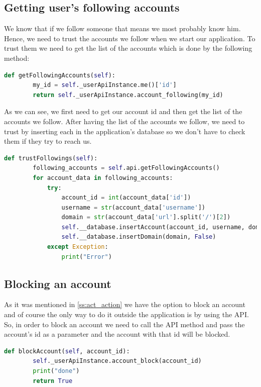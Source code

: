 \subsection{Getting user's following accounts}
We know that if we follow someone that means we most probably know him. Hence, we need to trust the accounts we follow when we start our application. To trust them we need to get the list of the accounts which is done by the following method:
\\[5pt]
\begin{lstlisting}[language=python, caption={Method to get the list of the accounts we follow}, captionpos=b]
	def getFollowingAccounts(self):
		my_id = self._userApiInstance.me()['id']
		return self._userApiInstance.account_following(my_id)
\end{lstlisting}
As we can see, we first need to get our account id and then get the list of the accounts we follow. After having the list of the accounts we follow, we need to trust by inserting each in the application's database so we don't have to check them if they try to reach us.
\\[5pt]
\begin{lstlisting}[language=python, caption={Inserting the accounts we follow immediately in the application database}, captionpos=b]
	def trustFollowings(self):
		following_accounts = self.api.getFollowingAccounts()   
		for account_data in following_accounts:
			try:
				account_id = int(account_data['id'])
				username = str(account_data['username'])
				domain = str(account_data['url'].split('/')[2])
				self.__database.insertAccount(account_id, username, domain, False)
				self.__database.insertDomain(domain, False)
			except Exception:
				print("Error")
\end{lstlisting}
\subsection{Blocking an account}
As it was mentioned in \ref{ss:act_action} we have the option to block an account and of course the only way to do it outside the application is by using the API. So, in order to block an account we need to call the API method and pass the account's id as a parameter
and the account with that id will be blocked.
\\[5pt]
\begin{lstlisting}[language=python, caption={Blocking an account method}, captionpos=b]
	def blockAccount(self, account_id):
		self._userApiInstance.account_block(account_id)
		print("done")
		return True
\end{lstlisting}
